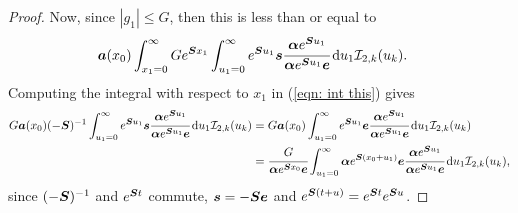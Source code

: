 \begin{proof}
	Now, since \(|g_1|\leq G\), then this is less than or equal to
	\begin{align}
		&\boldsymbol a (x_0) \int_{x_1=0}^\infty G  e^{\boldsymbol{S}x_1} \int_{u_1=0}^\infty e^{\boldsymbol{S}u_1}\boldsymbol s \cfrac{\boldsymbol \alpha e^{\boldsymbol{S}u_1}}{\boldsymbol \alpha e^{\boldsymbol{S}u_1}\boldsymbol e}\, \mathrm{d} u_1 \mathcal I_{2,k}(u_k).\label{eqn: int this}
	\end{align}
	Computing the integral with respect to \(x_1\) in (\ref{eqn: int this}) gives 
	\begin{align}
		 G  \boldsymbol a (x_0)(-\boldsymbol{S})^{-1} \int_{u_1=0}^\infty e^{\boldsymbol{S}u_1}\boldsymbol s \cfrac{\boldsymbol \alpha e^{\boldsymbol{S}u_1}}{\boldsymbol \alpha e^{\boldsymbol{S}u_1}\boldsymbol e}\, \mathrm{d} u_1 \mathcal I_{2,k}(u_k) \nonumber 
		&= G \boldsymbol a (x_0)\int_{u_1=0}^\infty e^{\boldsymbol{S}u_1}\boldsymbol e \cfrac{\boldsymbol \alpha e^{\boldsymbol{S}u_1}}{\boldsymbol \alpha e^{\boldsymbol{S}u_1}\boldsymbol e}\, \mathrm{d} u_1\mathcal I_{2,k}(u_k) \nonumber 
		\\&=  \cfrac{G}{\boldsymbol \alpha e^{\boldsymbol{S}x_0}\boldsymbol e} \int_{u_1=0}^\infty \boldsymbol \alpha e^{\boldsymbol{S}(x_0+u_1)}\boldsymbol e \cfrac{\boldsymbol \alpha e^{\boldsymbol{S}u_1}}{\boldsymbol \alpha e^{\boldsymbol{S}u_1}\boldsymbol e}\, \mathrm{d} u_1\mathcal I_{2,k}(u_k), \label{eqn: yet another label}
	\end{align}
	since \((-\boldsymbol{S})^{-1}\) and \(e^{\boldsymbol{S}t}\) commute, \(\boldsymbol s = - \boldsymbol{S} \boldsymbol e \) and \(e^{\boldsymbol{S}(t+u)} = e^{\boldsymbol{S}t}e^{\boldsymbol{S}u}\). 
	

\end{proof}
